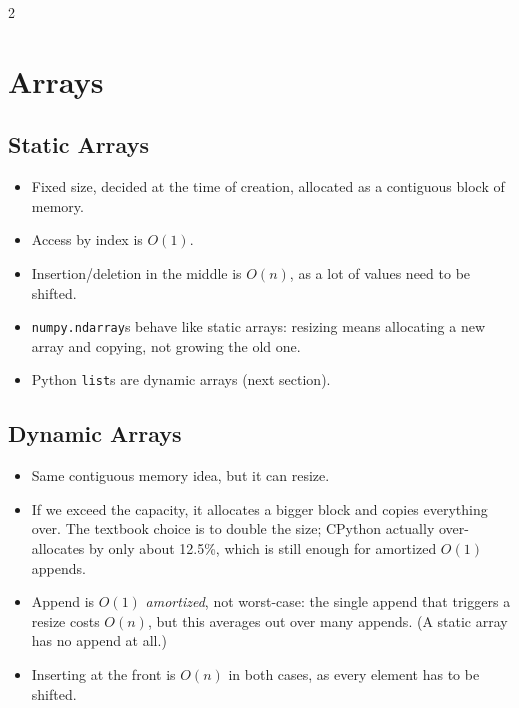 \documentclass[9pt,a4paper]{extarticle}
\begin{document}
\begin{multicols}{2}
\section{Arrays}

\subsection{Static Arrays}

\begin{itemize}
\item Fixed size, decided at the time of creation, allocated as a contiguous block of memory.
\item Access by index is $O(1)$.
\item Insertion/deletion in the middle is $O(n)$, as a lot of values need to be shifted.
\item \texttt{numpy.\allowbreak{}ndarray}s behave like static arrays: resizing means allocating a new array and copying, not growing the old one.
\item Python \texttt{list}s are dynamic arrays (next section).
\end{itemize}

\subsection{Dynamic Arrays}

\begin{itemize}
\item Same contiguous memory idea, but it can resize.
\item If we exceed the capacity, it allocates a bigger block and copies everything over. The textbook choice is to double the size; CPython actually over-allocates by only about 12.5\%, which is still enough for amortized $O(1)$ appends.
\item Append is $O(1)$ \emph{amortized}, not worst-case: the single append that triggers a resize costs $O(n)$, but this averages out over many appends. (A static array has no append at all.)
\item Inserting at the front is $O(n)$ in both cases, as every element has to be shifted.
\end{itemize}


\end{multicols}
\end{document}
